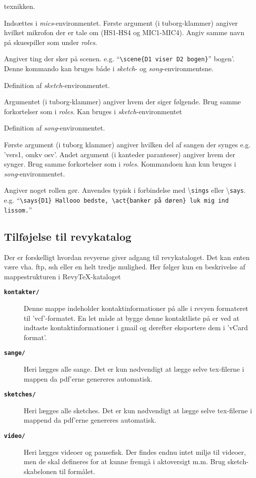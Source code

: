 \documentclass{article}
\newcommand{\env}[1]{\textit{#1}}
\newcommand{\fname}[1]{\textbf{\texttt{#1}}}
\newcommand{\cmd}[1]{\textbackslash \texttt{#1}}
\newcommand{\envbegin}[1]{\cmd{begin}\{\env{#1}\}}
\newcommand{\envend}[1]{\cmd{end}\{\env{#1}\}}
\newcommand{\example}[1]{``\texttt{#1}''}
\begin{document}
\begin{description}
texnikken.
\item[\cmd{mic}\{\}:] Indsættes i \env{mics}-environmentet. Første argument (i
tuborg-klammer) angiver hvilket mikrofon der er tale om (HS1-HS4 og
MIC1-MIC4). Angiv samme navn på skuespiller som under \env{roles}.
\item[\cmd{scene}\{\}:] Angiver ting der sker på scenen. e.g.
\example{\cmd{scene}\{D1 viser D2 bogen\}}
bogen'. Denne kommando kan bruges både i \env{sketch}- og
\env{song}-environmentsne.
\item[\envbegin{sketch} .. \envend{sketch}:] Definition af \env{sketch}-environmentet. 
\item[\cmd{says}\{\}:] Argumentet (i tuborg-klammer) angiver hvem der siger
følgende. Brug samme forkortelser som i \env{roles}. Kan bruges i
\env{sketch}-environmentet
\item[\envbegin{song} .. \envend{song}:] Definition af \env{song}-environmentet.
\item[\cmd{sings}\{\}{[]}] Første argument (i tuborg klammer) angiver
hvilken del af sangen der synges e.g. 'vers1, omkv osv'. Andet argument
(i kanteder paranteser) angiver hvem der synger. Brug samme forkortelser
som i \env{roles}. Kommandoen kan kun bruges i \env{song}-environmentet.
\item[\cmd{act}\{\}:] Angiver noget rollen gør. Anvendes typisk i
forbindelse med \cmd{sings} eller \cmd{says}. e.g. \example{\cmd{says}\{D1\}
Hallooo bedste, \cmd{act}\{banker på døren\} luk mig ind lissom.}
\end{description}

\subsection{Tilføjelse til revykatalog}
Der er forskelligt hvordan revyerne giver adgang til revykataloget. Det
kan enten være vha. ftp, ssh eller en helt tredje mulighed. Her følger
kun en beskrivelse af mappestrukturen i RevyTeX-kataloget

\begin{description}
\item[\fname{kontakter/}] Denne mappe indeholder kontaktinformationer på alle i
revyen formateret til 'vcf'-formatet. En let måde at bygge denne
kontaktliste på er ved at indtaste kontaktinformationer i gmail og
derefter eksportere dem i 'vCard format'.
\item[\fname{sange/}] Heri lægges alle sange. Det er kun nødvendigt at lægge
selve tex-filerne i mappen da pdf'erne genereres automatisk.
\item[\fname{sketches/}] Heri lægges alle sketches. Det er kun nødvendigt at
lægge selve tex-filerne i mappend da pdf'erne genereres automatisk.
\item[\fname{video/}] Heri lægges videoer og pausefisk. Der findes endnu intet
miljø til videoer, men de skal defineres for at kunne fremgå i
aktoversigt m.m. Brug sketch-skabelonen til formålet.
\end{description}
\end{document}
